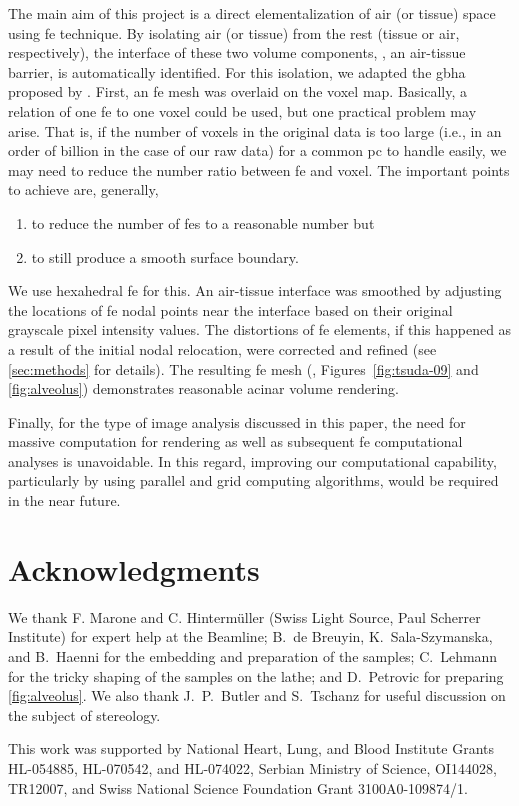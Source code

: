 The main aim of this project is a direct elementalization of air (or tissue) space using \ac{fe} technique. By isolating air (or tissue) from the rest (tissue or air, respectively), the interface of these two volume components, \ie, an air-tissue barrier, is automatically identified. For this isolation, we adapted the \ac{gbha} proposed by \citet{Schneiders1996}. First, an \ac{fe} mesh was overlaid on the voxel map. Basically, a relation of one \ac{fe} to one voxel could be used, but one practical problem may arise. That is, if the number of voxels in the original data is too large (i.e., in an order of billion in the case of our raw data) for a common \ac{pc} to handle easily, we may need to reduce the number ratio between \ac{fe} and voxel. The important points to achieve are, generally, 
\begin{enumerate}
	\item to reduce the number of \acp{fe} to a reasonable number but
	\item to still produce a smooth surface boundary.
\end{enumerate}
We use hexahedral \ac{fe} for this. An air-tissue interface was smoothed by adjusting the locations of \ac{fe} nodal points near the interface based on their original grayscale pixel intensity values. The distortions of \ac{fe} elements, if this happened as a result of the initial nodal relocation, were corrected and refined (see \autoref{sec:methods} for details). The resulting \threed \ac{fe} mesh (\eg, Figures~\ref{fig:tsuda-09} and \ref{fig:alveolus}) demonstrates reasonable acinar volume rendering.

Finally, for the type of image analysis discussed in this paper, the need for massive computation for \threed rendering as well as subsequent \ac{fe} computational analyses is unavoidable. In this regard, improving our computational capability, particularly by using parallel and grid computing algorithms, would be required in the near future.

\section{Acknowledgments}
We thank F. Marone and C. Hintermüller (Swiss Light Source, Paul Scherrer Institute) for expert help at the Beamline; B.\ de Breuyin, K.\ Sala-Szymanska, and B.\ Haenni for the embedding and preparation of the samples; C.\ Lehmann for the tricky shaping of the samples on the lathe; and D.\ Petrovic for preparing \autoref{fig:alveolus}. We also thank J.\ P.\ Butler and S.\ Tschanz for useful discussion on the subject of stereology.

This work was supported by National Heart, Lung, and Blood Institute Grants HL-054885, HL-070542, and HL-074022, Serbian Ministry of Science, OI144028, TR12007, and Swiss National Science Foundation Grant 3100A0-109874/1.

